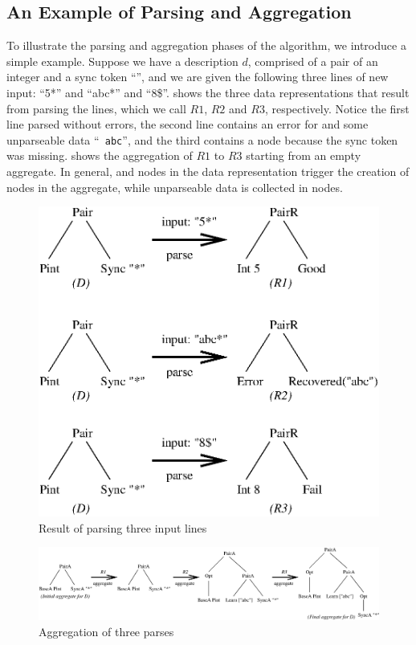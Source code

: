 \subsection{An Example of Parsing and Aggregation}
To illustrate the parsing and aggregation phases of the algorithm, we
introduce a simple example.
Suppose we have a description $d$, comprised of a pair of an integer and a sync token ``\cd{*}'',
and we are given the following three lines of new input: ``5*'' and
``abc*'' and ``8\$''.
 shows the three data representations that result
from parsing the lines, which we call $R1$, $R2$ and $R3$,
respectively. Notice the first line parsed without errors, the second
line contains an error for  and some unparseable data ``{\tt
  abc}'', and the third contains a  node because the
sync token \cd{*} was missing.   shows the aggregation
of $R1$ to $R3$ starting from an empty aggregate. In
general,  and  nodes in the data representation
trigger the creation of  nodes in the aggregate, while
unparseable data is collected in  nodes.

\begin{figure}[t]
\begin{center}
\includegraphics[width=0.8\columnwidth]{parse}
\caption{Result of parsing three input lines}\label{fig:parse}
\end{center}
\end{figure}

\begin{figure}[t]
\begin{center}
\includegraphics[width=2\columnwidth]{aggregate}
\caption{Aggregation of three parses}\label{fig:aggregate}
\end{center}
\end{figure}



